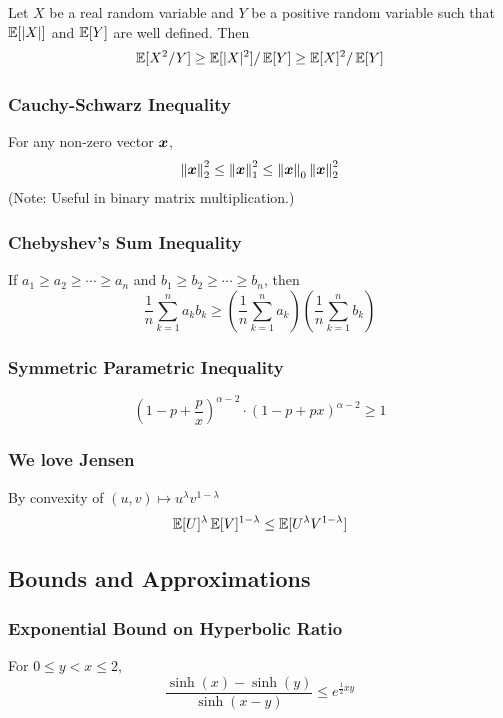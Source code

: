 \documentclass[10pt]{article}
\begin{document}
 Let $X$ be a real random variable and $Y$ be a positive random variable such that $\mathop{\mathbb{E} \displaystyle} [|X|]$ and $\mathop{\mathbb{E} \displaystyle}[Y]$ are well defined. Then 
\begin{equation}
    \mathop{\mathbb{E} \displaystyle}[X^2/Y] \geq \mathop{\mathbb{E} \displaystyle} [|X|^2] / \mathop{\mathbb{E} \displaystyle} [Y] \geq \mathop{\mathbb{E} \displaystyle}[X]^2 / \mathop{\mathbb{E} \displaystyle}[Y]
\end{equation}

\subsubsection{Cauchy-Schwarz Inequality}
For any non-zero vector ${\bm{x}}$, 
\begin{equation}
    \left\lVert{\bm{x}}\right\rVert_2^2 \leq \left\lVert{\bm{x}}\right\rVert_1^2 \leq \left\lVert{\bm{x}}\right\rVert_0 \left\lVert{\bm{x}}\right\rVert_2^2 
\end{equation}
(Note: Useful in binary matrix multiplication.)

\subsubsection{Chebyshev's Sum Inequality}
If $a_1 \geq a_2 \geq \cdots \geq a_n$ and $b_1 \geq b_2 \geq \cdots \geq b_n$, then
\begin{equation}
    \frac{1}{n} \sum_{k=1}^n a_k b_k \geq \left(\frac{1}{n} \sum_{k=1}^n a_k \right) \left( \frac{1}{n} \sum_{k=1}^n b_k \right) 
\end{equation}

\subsubsection{Symmetric Parametric Inequality}
\begin{equation}
 \left( 1- p + \frac{p}{x} \right)^{\alpha-2} \cdot (1- p + px)^{\alpha-2} \geq 1
\end{equation}
\subsubsection{We love Jensen}
By convexity of $(u,v) \mapsto u^{\lambda} v^{1-\lambda}$
\begin{equation}
    \mathop{\mathbb{E} \displaystyle}[U]^{\lambda} \mathop{\mathbb{E} \displaystyle}[V]^{1-\lambda } \leq \mathop{\mathbb{E} \displaystyle}[U^{\lambda} V^{1- \lambda}] 
\end{equation}
\subsection{Bounds and Approximations}
\subsubsection{Exponential Bound on Hyperbolic Ratio}
For $0 \leq y < x \leq 2$,
\begin{equation}
    \frac{\sinh(x) - \sinh(y)}{\sinh(x-y)} \leq e^{\frac{1}{2} x y}
\end{equation}
\end{document}
